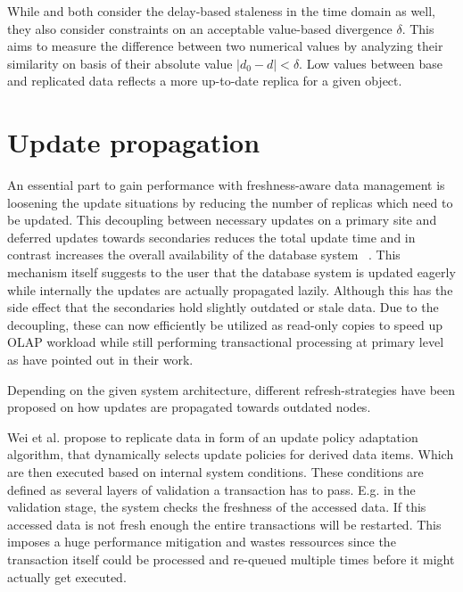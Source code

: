 While \cite{xiang:2008} and \cite{fekete:2018} both consider the delay-based staleness in the time domain as well, they also consider constraints on 
an acceptable value-based divergence $\delta$. This aims to measure the difference between two numerical values by analyzing their similarity on basis of their 
absolute value $|d_0 - d| < \delta $. Low values between base and replicated data reflects a more up-to-date replica for a given object.




\section{Update propagation}
\label{r:replication}
An essential part to gain performance with freshness-aware data management is loosening the update situations by reducing the number of 
replicas which need to be updated. This decoupling between necessary updates on a primary site and deferred updates towards secondaries 
reduces the total update time and in contrast increases the overall availability of the database system ~\cite{quorums:2003}.
This mechanism itself suggests to the user that the database system is updated eagerly while internally the updates are actually propagated lazily. 
Although this has the side effect that the secondaries hold slightly outdated or stale data.
Due to the decoupling, these can now efficiently be utilized as read-only copies to speed up OLAP workload while still performing transactional processing 
at primary level as \cite{psaroudakis:2015, rohm:2002, xiang:2008} have pointed out in their work.

Depending on the given system architecture, different refresh-strategies have been proposed on how updates are propagated towards outdated nodes.

Wei et al. \cite{wei:2004} propose to replicate data in form of an update policy adaptation algorithm, that dynamically selects update policies
for derived data items. Which are then executed based on internal system conditions. These conditions are defined as several layers of validation a transaction has to pass.
E.g. in the validation stage, the system checks the freshness of the accessed data. If this accessed data is not fresh enough the entire transactions will be restarted.
This imposes a huge performance mitigation and wastes ressources since the transaction itself could be processed and re-queued multiple times before it might actually get executed.\\

